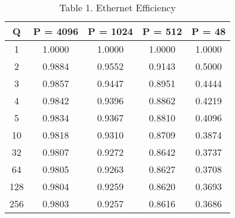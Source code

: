 
\begin{table}[ht]
\centering \tiny %
\caption*{Table 1. Ethernet Efficiency}
\begin{tabular}{c|cccc}
\hline
\textbf{Q} & \textbf{P = 4096} & \textbf{P = 1024} & \textbf{P = 512} & \textbf{P = 48} \\
\hline
1   & 1.0000 & 1.0000 & 1.0000 & 1.0000 \\
2   & 0.9884 & 0.9552 & 0.9143 & 0.5000 \\
3   & 0.9857 & 0.9447 & 0.8951 & 0.4444 \\
4   & 0.9842 & 0.9396 & 0.8862 & 0.4219 \\
5   & 0.9834 & 0.9367 & 0.8810 & 0.4096 \\
10  & 0.9818 & 0.9310 & 0.8709 & 0.3874 \\
32  & 0.9807 & 0.9272 & 0.8642 & 0.3737 \\
64  & 0.9805 & 0.9263 & 0.8627 & 0.3708 \\
128 & 0.9804 & 0.9259 & 0.8620 & 0.3693 \\
256 & 0.9803 & 0.9257 & 0.8616 & 0.3686 \\
\hline
\end{tabular}
\end{table}

